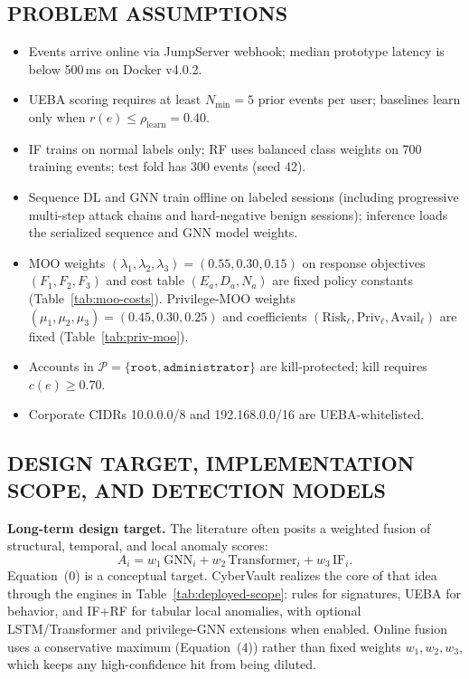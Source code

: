 \documentclass{ieeeaccess}
\begin{document}
\subsection{PROBLEM ASSUMPTIONS}
\begin{itemize}
\item Events arrive online via JumpServer webhook; median prototype latency is below 500\,ms on Docker v4.0.2.
\item UEBA scoring requires at least $N_{\min}=5$ prior events per user; baselines learn only when $r(e)\leq\rho_{\mathrm{learn}}=0.40$.
\item IF trains on normal labels only; RF uses balanced class weights on 700 training events; test fold has 300 events (seed 42).
\item Sequence DL and GNN train offline on labeled sessions (including progressive multi-step attack chains and hard-negative benign sessions); inference loads the serialized sequence and GNN model weights.
\item MOO weights $(\lambda_1,\lambda_2,\lambda_3)=(0.55,0.30,0.15)$ on response objectives $(F_1,F_2,F_3)$ and cost table $(E_a,D_a,N_a)$ are fixed policy constants (Table~\ref{tab:moo-costs}). Privilege-MOO weights $(\mu_1,\mu_2,\mu_3)=(0.45,0.30,0.25)$ and coefficients $(\mathrm{Risk}_{\ell},\mathrm{Priv}_{\ell},\mathrm{Avail}_{\ell})$ are fixed (Table~\ref{tab:priv-moo}).
\item Accounts in $\mathcal{P}=\{\texttt{root},\texttt{administrator}\}$ are kill-protected; kill requires $c(e)\geq 0.70$.
\item Corporate CIDRs 10.0.0.0/8 and 192.168.0.0/16 are UEBA-whitelisted.
\end{itemize}


\subsection{DESIGN TARGET, IMPLEMENTATION SCOPE, AND DETECTION MODELS}

\textbf{Long-term design target.} The literature often posits a weighted fusion of structural, temporal, and local anomaly scores:
\begin{equation}
A_i = w_1\,\mathrm{GNN}_i + w_2\,\mathrm{Transformer}_i + w_3\,\mathrm{IF}_i.
\tag{0}
\end{equation}
Equation~(0) is a conceptual target. CyberVault realizes the core of that idea through the engines in Table~\ref{tab:deployed-scope}: rules for signatures, UEBA for behavior, and IF+RF for tabular local anomalies, with optional LSTM/Transformer and privilege-GNN extensions when enabled. Online fusion uses a conservative maximum (Equation~(4)) rather than fixed weights $w_1,w_2,w_3$, which keeps any high-confidence hit from being diluted.
\end{document}
